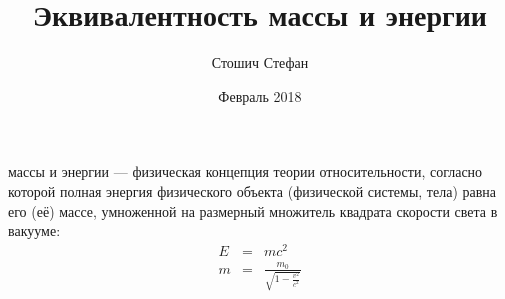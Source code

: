 \documentclass[12pt]{article}
\title{Эквивалентность массы и энергии}
\date{Февраль 2018}
\author{Стошич Стефан}
\begin{document}
  
  \maketitle  
  { массы и энергии} — физическая концепция теории относительности, согласно которой полная энергия физического объекта (физической системы, тела) равна его (её) массе, умноженной на размерный множитель квадрата скорости света в вакууме:  
  \newline  
  \begin{eqnarray}  
    E &=& mc^2\\  
    m &=& \frac{m_0}{\sqrt{1-\frac{v^2}{c^2}}}  
  \end{eqnarray}  
    
\end{document}
